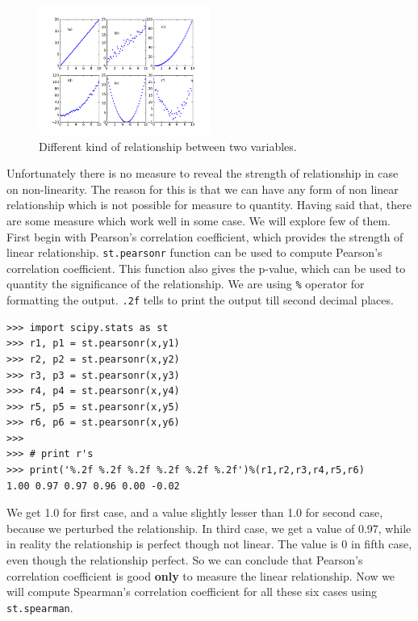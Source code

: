 \documentclass[10pt]{book}
\begin{document}
{\beforefig
\begin{figure}[h!]
  \centering
    \includegraphics[width=0.5\textwidth]{images/corr.png}
  \caption{Different kind of relationship between two variables.}
   \label{fig:corr}
\end{figure}
\afterfig

Unfortunately there is no measure to reveal the strength of relationship in case on non-linearity.  The reason for this is that we can have any form of non linear relationship which is not possible for measure to quantity. Having said that, there are some measure which work well in some case. We will explore few of them. First begin with Pearson's correlation coefficient, which provides the strength of linear relationship. \verb"st.pearsonr" function can be used to compute Pearson's correlation coefficient. This function also gives the p-value, which can be used to quantity the significance of the relationship. We are using \verb"%" 
operator for formatting the output. \verb".2f" tells to print the output till second decimal places. 
\beforeverb \begin{verbatim}
>>> import scipy.stats as st
>>> r1, p1 = st.pearsonr(x,y1)
>>> r2, p2 = st.pearsonr(x,y2)
>>> r3, p3 = st.pearsonr(x,y3)
>>> r4, p4 = st.pearsonr(x,y4)
>>> r5, p5 = st.pearsonr(x,y5)
>>> r6, p6 = st.pearsonr(x,y6)
>>> 
>>> # print r's
>>> print('%.2f %.2f %.2f %.2f %.2f %.2f')%(r1,r2,r3,r4,r5,r6)
1.00 0.97 0.97 0.96 0.00 -0.02
\end{verbatim} \afterverb
We get 1.0 for first case, and a value slightly lesser than 1.0 for second case, because we perturbed the relationship. In third case, we get a value of 0.97, while in reality the relationship is perfect though not linear. The value is 0 in fifth case, even though the relationship perfect. So we can conclude that Pearson's correlation coefficient is good {\bf only} to measure the linear relationship. Now we will compute Spearman's correlation coefficient for all these six cases using \verb"st.spearman".
\beforeverb \begin{verbatim}

\end{verbatim}}
\end{document}
